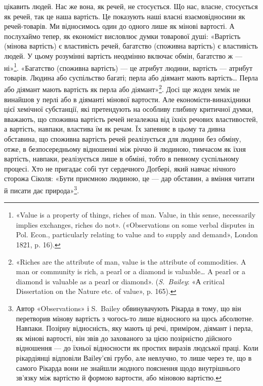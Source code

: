 \parcont{}  %
цікавить людей. Нас же вона, як речей, не стосується. Що нас,
власне, стосується як речей, так це наша вартість. Це показують
наші власні взаємовідносини як речей-товарів. Ми відносимось
один до одного лише як мінові вартості. А послухаймо
тепер, як економіст висловлює думки товарової душі: «Вартість
(мінова вартість) є властивість речей, багатство (споживна вартість)
є властивість людей. У цьому розумінні вартість неодмінно
включає обмін, багатство ж — ні»\footnote{
«Value is a property of things, riches of man. Value, in this sense,
necessarily implies exchanges, riches do not». («Observations on some verbal
disputes in Pol. Econ., particularly relating to value and to supply and
demand», London 1821, p. 16).
}. «Багатство (споживна вартість) —
це атрибут людини, вартість — атрибут товарів. Людина
або суспільство багаті; перла або діямант мають вартість\dots{}
Перла або діямант мають вартість як перла або діямант»\footnote{
«Riches are the attribute of man, value is the attribute of commodities.
A man or community is rich, a pearl or a diamond is valuable\dots{}
A pearl or a diamond is valuable as a pearl or diamond». (\emph{S.~Bailey}:
«А critical Dissertation on the Nature etc. of value», p. 165).
}.
Досі ще жоден хемік не винайшов у перлі або в діяманті мінової
вартости. Але економісти-винахідники цієї хемічної субстанції,
які претендують на особливу глибину критичної думки, вважають,
що споживна вартість речей незалежна від їхніх речових властивостей,
а вартість, навпаки, властива їм як речам. Їх запевняє
в цьому та дивна обставина, що споживна вартість речей реалізується
для людини без обміну, отже, в безпосередньому відношенні
між річчю й людиною, тимчасом як їхня вартість, навпаки,
реалізується лише в обміні, тобто в певному суспільному процесі.
Хто не пригадає собі тут сердечного Доґбері, який навчає нічного
сторожа Сіколя: «Бути приємною людиною, це — дар обставин,
а вміння читати й писати дає природа»\footnote{
Автор «Observations» і S.~Bailey обвинувачують Рікарда в тому,
що він перетворив мінову вартість з чогось-то лише відносного на щось
абсолютне. Навпаки. Позірну відносність, яку мають ці речі, приміром,
діямант і перла, як мінові вартості, він звів до захованого за цією позірністю
дійсного відношення — до їхньої відносности як простих виразів
людської праці. Коли рікардіянці відповіли Ваіlеу’єві грубо, але невлучно,
то лише через те, що в самого Рікарда вони не знайшли жодного
пояснення щодо внутрішнього зв’язку між вартістю й формою вартости,
або міновою вартістю.
}.

